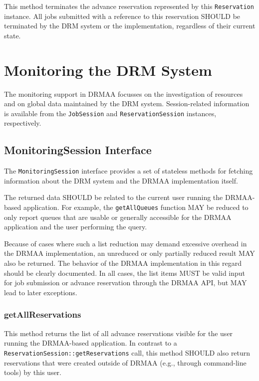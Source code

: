 \documentclass{article}
\newcommand{\h}[1]{\lstinline|#1|}
\begin{document}
This method terminates the advance reservation represented by this \h{Reservation} instance. All jobs submitted with a reference to this reservation SHOULD be terminated by the DRM system or the implementation, regardless of their current state.

\section{Monitoring the DRM System}

The monitoring support in DRMAA focusses on the investigation of resources and on global data maintained by the DRM system. Session-related information is available from the \h{JobSession} and \h{ReservationSession} instances, respectively.

\subsection{MonitoringSession Interface}
\label{sec:monitoringsession}

The \h{MonitoringSession} interface provides a set of stateless methods for fetching information about the DRM system and the DRMAA implementation itself.



The returned data SHOULD be related to the current user running the DRMAA-based application. For example, the \h{getAllQueues} function MAY be reduced to only report queues that are usable or generally accessible for the DRMAA application and the user performing the query.

Because of cases where such a list reduction may demand excessive overhead in the DRMAA implementation, an unreduced or only partially reduced result MAY also be returned. The behavior of the DRMAA implementation in this regard should be clearly documented. In all cases, the list items MUST be valid input for job submission or advance reservation through the DRMAA API, but MAY lead to later exceptions.

\subsubsection{getAllReservations}
\label{sec:getallreservations}

This method returns the list of all advance reservations visible for the user running the DRMAA-based application. In contrast to a \h{ReservationSession::getReservations} call, this method SHOULD also return reservations that were created outside of DRMAA (e.g., through command-line tools) by this user.
\end{document}
